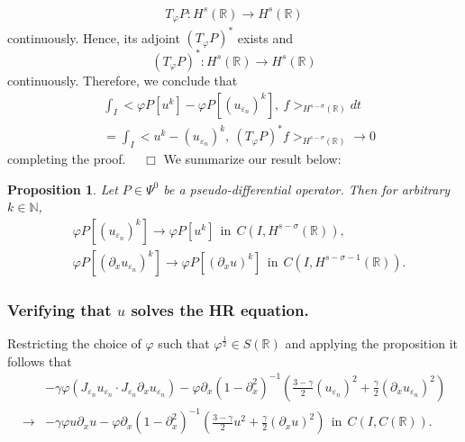\documentclass{beamer}
\newcommand{\rr}{\mathbb{R}}
\newcommand{\p}{\partial}
\newcommand{\ee}{\varepsilon}
\newcommand{\vp}{\varphi}
\newtheorem{proposition}{Proposition}
\begin{document}
\begin{frame}
\begin{equation*}
\begin{split}
T_\vp P: H^s(\rr) \to H^s(\rr)
\end{split}
\end{equation*}
continuously. Hence, its adjoint  $(T_\varphi P)^*$
exists and
\begin{equation*}
(T_\varphi P)^*: H^s(\rr) \to H^s(\rr) 
\end{equation*}
continuously. Therefore, we conclude that
\begin{equation}
\label{widpseudo}
\begin{split}
& \int_I <\varphi P[u^k] - \varphi
P [(u_{\ee_n})^k],\  f>_{H^{s-\sigma }(\rr)} dt
\\
&= \int_I <u^k - 
(u_{\ee_n})^k, \ (T_\vp P)^* f>_{H^{s-\sigma }(\rr)} \to 0
\end{split}
\end{equation}
completing the proof. $\quad \Box$
\vskip0.1in
%
%
We summarize our result below:
\end{frame}
\begin{frame}
\begin{proposition}
\label{hhthm:crit1}
Let $P \in \Psi^0$ be a pseudo-differential operator. Then for
arbitrary $k \in \mathbb{N}$, 
\begin{equation}
\begin{split}
& \vp P [(u_{\ee_n})^k] \to \vp P [u^k] \ \ \text{in}  \ \ C(I,
H^{s-\sigma }(\rr)),
\\
& 
\vp P [(\p_x u_{\ee_n})^k] \to \vp P [(\p_x u)^k] \ \
\text{in}  \ \ C(I,
H^{s-\sigma -1}(\rr)).
\label{hhdx_vp_u_ep_conv}
\end{split}
\end{equation}
\end{proposition}
\vskip0.1in
\end{frame}
\begin{frame}
\frametitle{Verifying that $u$ solves the HR equation.} 
Restricting the
choice of $\vp$ such that $\vp^\frac{1}{2} \in S(\rr)$ and applying the
proposition it follows that
\begin{equation}
\begin{split}
& -\gamma \vp (J_{\ee_n} u_{\ee_n} \cdot J_{\ee_n} \p_x
u_{\ee_n}) -
\vp \p_x(1- \p_x^2)^{-1} \left( \frac{3-\gamma}{2}
(u_{\ee_n})^2
+ \frac{\gamma}{2} (\p_x u_{\ee_n})^2 \right )
\\
\to & -\gamma \vp u \p_x u -
\vp \p_x(1- \p_x^2)^{-1} \left( \frac{3-\gamma}{2} u^2
+ \frac{\gamma}{2} (\p_x u)^2 \right ) \ \
\text{in} \ \ C(I, C(\rr)).
\label{llloc-non-loc-tog}
\end{split}
\end{equation}
%
\end{frame}
\end{document}
